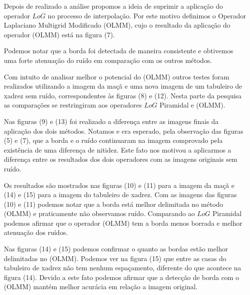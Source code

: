 \documentclass[a4paper]{article} %
\begin{document}
Depois de realizado a análise propomos a ideia de suprimir a aplicação do operador $LoG$ no processo de interpolação. Por este motivo definimos o Operador Laplaciano Multigrid Modificado (OLMM), cujo o resultado da aplicação do operador (OLMM) está na figura (7).

Podemos notar que a borda foi detectada de maneira consistente e obtivemos uma forte atenuação do ruído em comparação com os outros métodos.

Com intuito de analisar melhor o potencial do (OLMM) outros testes foram realizados utilizando a imagem da maçã e uma nova imagem de um tabuleiro de xadrez sem ruído, correspondentes às figuras (8) e (12). Nesta parte da pesquisa as comparações se restringiram aos operadores $LoG$ Piramidal e (OLMM).

Nas figuras (9) e (13) foi realizado a diferença entre as imagens finais da aplicação dos dois métodos. Notamos e era esperado, pela observação das figuras (5) e (7), que a borda e o ruído continuaram na imagem comprovado pela existência de uma diferença de nitidez. Este fato nos motivou a aplicarmos a diferença entre os resultados dos dois operadores com as imagens originais sem ruído.

Os resultados são mostrados nas figuras (10) e (11) para a imagem da maçã e (14) e (15) para a imagem do tabuleiro de xadrez. Com as imagens das figuras (10) e (11) podemos notar que a borda está melhor delimitada no método (OLMM) e praticamente não observamos ruído. Comparando ao $LoG$ Piramidal podemos afirmar que o operador (OLMM) tem a borda menos borrada e melhor atenuação dos ruídos.      
 
Nas figuras (14) e (15) podemos confirmar o quanto as bordas estão melhor delimitadas no (OLMM). Podemos ver na figura (15) que entre as casas do tabuleiro de xadrez não tem nenhum espaçamento, diferente do que acontece na figura (14). Devido a este fato podemos afirmar que a detecção de borda com o (OLMM) mantém melhor acurácia em relação a imagem original. 
\end{document}
